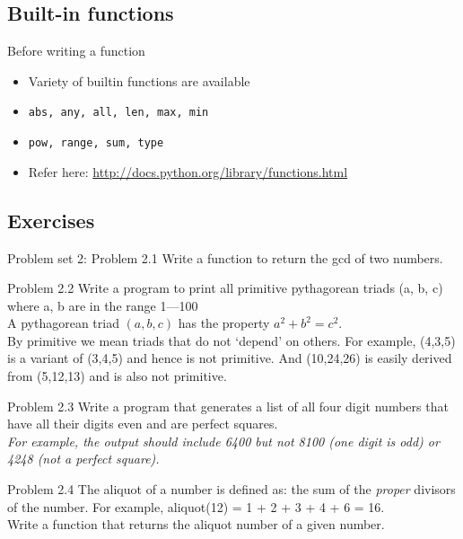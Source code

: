 \documentclass[14pt,compress]{beamer}
\newcounter{time}
\newcommand{\inctime}[1]{\addtocounter{time}{#1}{\tiny \thetime\ m}}
\newcommand{\typ}[1]{\texttt{#1}}
\begin{document}
\subsection{Built-in functions}
\begin{frame}
  {Before writing a function}
  \begin{itemize}
      \item Variety of builtin functions are available
      \item \typ{abs, any, all, len, max, min}
      \item \typ{pow, range, sum, type}
      \item Refer here:
          \url{http://docs.python.org/library/functions.html}
  \end{itemize}
  \inctime{10} 
\end{frame}

\subsection{Exercises}
\begin{frame}{Problem set 2: Problem 2.1}
  Write a function to return the gcd of two numbers.
\end{frame}

\begin{frame}{Problem 2.2}
Write a program to print all primitive pythagorean triads (a, b, c) where a, b are in the range 1---100 \\
A pythagorean triad $(a,b,c)$ has the property $a^2 + b^2 = c^2$.\\By primitive we mean triads that do not `depend' on others. For example, (4,3,5) is a variant of (3,4,5) and hence is not primitive. And (10,24,26) is easily derived from (5,12,13) and is also not primitive.
\end{frame}

\begin{frame}{Problem 2.3}
  Write a program that generates a list of all four digit numbers that have all their digits even and are perfect squares.\newline\\\emph{For example, the output should include 6400 but not 8100 (one digit is odd) or 4248 (not a perfect square).}
\end{frame}

\begin{frame}{Problem 2.4}
  The aliquot of a number is defined as: the sum of the \emph{proper} divisors of the number. For example, aliquot(12) = 1 + 2 + 3 + 4 + 6 = 16.\\
  Write a function that returns the aliquot number of a given number. 
\end{frame}
\end{document}
